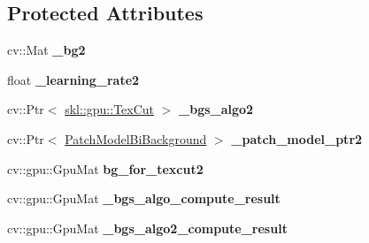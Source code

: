 \subsection*{Protected Attributes}
\begin{DoxyCompactItemize}
\item 
\hypertarget{classskl_1_1gpu_1_1_table_object_manager_bi_background_acdea7a839910b0e1776ad4e35405c072}{}\label{classskl_1_1gpu_1_1_table_object_manager_bi_background_acdea7a839910b0e1776ad4e35405c072} 
cv\+::\+Mat {\bfseries \+\_\+bg2}
\item 
\hypertarget{classskl_1_1gpu_1_1_table_object_manager_bi_background_ae8d4390f84787dd6d4ef6437c2b0e839}{}\label{classskl_1_1gpu_1_1_table_object_manager_bi_background_ae8d4390f84787dd6d4ef6437c2b0e839} 
float {\bfseries \+\_\+learning\+\_\+rate2}
\item 
\hypertarget{classskl_1_1gpu_1_1_table_object_manager_bi_background_a93460f344b945e352e84032dcac7df35}{}\label{classskl_1_1gpu_1_1_table_object_manager_bi_background_a93460f344b945e352e84032dcac7df35} 
cv\+::\+Ptr$<$ \hyperlink{classskl_1_1gpu_1_1_tex_cut}{skl\+::gpu\+::\+Tex\+Cut} $>$ {\bfseries \+\_\+bgs\+\_\+algo2}
\item 
\hypertarget{classskl_1_1gpu_1_1_table_object_manager_bi_background_a5f06d36acedb4c9418e7ad648c6235c7}{}\label{classskl_1_1gpu_1_1_table_object_manager_bi_background_a5f06d36acedb4c9418e7ad648c6235c7} 
cv\+::\+Ptr$<$ \hyperlink{classskl_1_1_patch_model_bi_background}{Patch\+Model\+Bi\+Background} $>$ {\bfseries \+\_\+patch\+\_\+model\+\_\+ptr2}
\item 
\hypertarget{classskl_1_1gpu_1_1_table_object_manager_bi_background_a2b4ec62aba8ac187b4c0cb1879500cec}{}\label{classskl_1_1gpu_1_1_table_object_manager_bi_background_a2b4ec62aba8ac187b4c0cb1879500cec} 
cv\+::gpu\+::\+Gpu\+Mat {\bfseries bg\+\_\+for\+\_\+texcut2}
\item 
\hypertarget{classskl_1_1gpu_1_1_table_object_manager_bi_background_a6815a6a60f9ddeedfcf21c70a8734480}{}\label{classskl_1_1gpu_1_1_table_object_manager_bi_background_a6815a6a60f9ddeedfcf21c70a8734480} 
cv\+::gpu\+::\+Gpu\+Mat {\bfseries \+\_\+bgs\+\_\+algo\+\_\+compute\+\_\+result}
\item 
\hypertarget{classskl_1_1gpu_1_1_table_object_manager_bi_background_aab0f1b6fc6c377376ce6010507033cb9}{}\label{classskl_1_1gpu_1_1_table_object_manager_bi_background_aab0f1b6fc6c377376ce6010507033cb9} 
cv\+::gpu\+::\+Gpu\+Mat {\bfseries \+\_\+bgs\+\_\+algo2\+\_\+compute\+\_\+result}
\item 

\end{DoxyCompactItemize}
